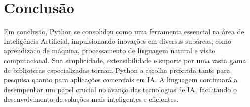 
\section{Conclusão}
Em conclusão, Python se consolidou como uma ferramenta essencial na área de Inteligência Artificial, impulsionando inovações em diversas subáreas, como aprendizado de máquina, processamento de linguagem natural e visão computacional. Sua simplicidade, extensibilidade e suporte por uma vasta gama de bibliotecas especializadas tornam Python a escolha preferida tanto para pesquisa quanto para aplicações comerciais em IA. A linguagem continuará a desempenhar um papel crucial no avanço das tecnologias de IA, facilitando o desenvolvimento de soluções mais inteligentes e eficientes.